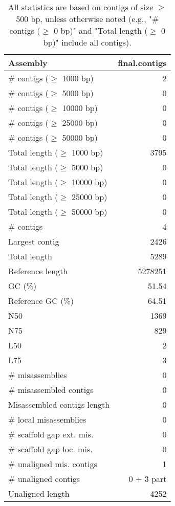 \documentclass[12pt,a4paper]{article}
\begin{document}
\begin{table}[ht]
\begin{center}
\caption{All statistics are based on contigs of size $\geq$ 500 bp, unless otherwise noted (e.g., "\# contigs ($\geq$ 0 bp)" and "Total length ($\geq$ 0 bp)" include all contigs).}
\begin{tabular}{|l*{1}{|r}|}
\hline
Assembly & final.contigs \\ \hline
\# contigs ($\geq$ 1000 bp) & 2 \\ \hline
\# contigs ($\geq$ 5000 bp) & 0 \\ \hline
\# contigs ($\geq$ 10000 bp) & 0 \\ \hline
\# contigs ($\geq$ 25000 bp) & 0 \\ \hline
\# contigs ($\geq$ 50000 bp) & 0 \\ \hline
Total length ($\geq$ 1000 bp) & 3795 \\ \hline
Total length ($\geq$ 5000 bp) & 0 \\ \hline
Total length ($\geq$ 10000 bp) & 0 \\ \hline
Total length ($\geq$ 25000 bp) & 0 \\ \hline
Total length ($\geq$ 50000 bp) & 0 \\ \hline
\# contigs & 4 \\ \hline
Largest contig & 2426 \\ \hline
Total length & 5289 \\ \hline
Reference length & 5278251 \\ \hline
GC (\%) & 51.54 \\ \hline
Reference GC (\%) & 64.51 \\ \hline
N50 & 1369 \\ \hline
N75 & 829 \\ \hline
L50 & 2 \\ \hline
L75 & 3 \\ \hline
\# misassemblies & 0 \\ \hline
\# misassembled contigs & 0 \\ \hline
Misassembled contigs length & 0 \\ \hline
\# local misassemblies & 0 \\ \hline
\# scaffold gap ext. mis. & 0 \\ \hline
\# scaffold gap loc. mis. & 0 \\ \hline
\# unaligned mis. contigs & 1 \\ \hline
\# unaligned contigs & 0 + 3 part \\ \hline
Unaligned length & 4252 \\ \hline

\end{tabular}
\end{center}
\end{table}
\end{document}
